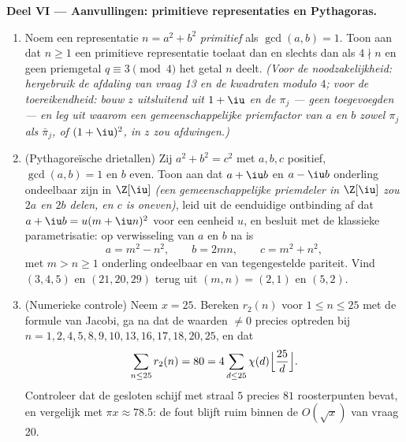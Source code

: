\begin{problem}
\medskip
\noindent\textbf{Deel VI --- Aanvullingen: primitieve
representaties en Pythagoras.}
\begin{enumerate}[resume]
  \item Noem een representatie $n = a^2 + b^2$ \emph{primitief} als
        $\gcd(a, b) = 1$. Toon aan dat $n \geq 1$ een primitieve
        representatie toelaat dan en slechts dan als $4 \nmid n$ en
        geen priemgetal $q \equiv 3 \pmod 4$ het getal $n$ deelt.
        \emph{(Voor de noodzakelijkheid: hergebruik de afdaling van
        vraag 13 en de kwadraten modulo $4$; voor de
        toereikendheid: bouw $z$ uitsluitend uit $1 + \iu$ en de
        $\pi_j$ --- geen toegevoegden --- en leg uit waarom een
        gemeenschappelijke priemfactor van $a$ en $b$ zowel $\pi_j$
        als $\bar\pi_j$, of $(1+\iu)^2$, in $z$ zou afdwingen.)}
  \item (Pythagoreïsche drietallen) Zij $a^2 + b^2 = c^2$ met $a,
        b, c$ positief, $\gcd(a, b) = 1$ en $b$ even. Toon aan dat
        $a + \iu b$ en $a - \iu b$ onderling ondeelbaar zijn in
        $\Z[\iu]$ \emph{(een gemeenschappelijke priemdeler in
        $\Z[\iu]$ zou $2a$ en $2b$ delen, en $c$ is oneven)}, leid
        uit de eenduidige ontbinding af dat $a + \iu b = u(m + \iu
        n)^2$ voor een eenheid $u$, en besluit met de klassieke
        parametrisatie: op verwisseling van $a$ en $b$ na is
        \[
        a = m^2 - n^2, \qquad b = 2mn, \qquad c = m^2 + n^2,
        \]
        met $m > n \geq 1$ onderling ondeelbaar en van
        tegengestelde pariteit. Vind $(3, 4, 5)$ en $(21, 20, 29)$
        terug uit $(m, n) = (2, 1)$ en $(5, 2)$.
  \item (Numerieke controle) Neem $x = 25$. Bereken $r_2(n)$ voor
        $1 \leq n \leq 25$ met de formule van Jacobi, ga na dat de
        waarden $\neq 0$ precies optreden bij $n = 1, 2, 4, 5, 8,
        9, 10, 13, 16, 17, 18, 20, 25$, en dat
        \[
        \sum_{n \leq 25} r_2(n) = 80
        = 4\sum_{d \leq 25}\chi(d)
        \Bigl\lfloor\frac{25}d\Bigr\rfloor .
        \]
        Controleer dat de gesloten schijf met straal $5$ precies
        $81$ roosterpunten bevat, en vergelijk met $\pi x \approx
        78.5$: de fout blijft ruim binnen de $O(\sqrt x)$ van vraag
        20.
\end{enumerate}
\end{problem}
